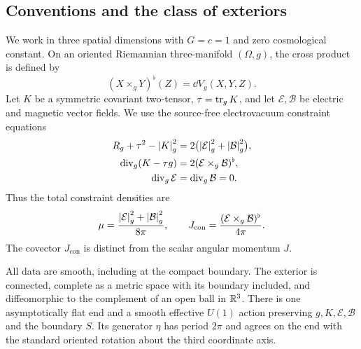 \subsection{Conventions and the class of exteriors}\label{sec:conventions}

We work in three spatial dimensions with \(G=c=1\) and zero cosmological
constant. On an oriented Riemannian three-manifold \((\Omega,g)\), the cross
product is defined by
\[
 (X\times_gY)^\flat(Z)=\dd V_g(X,Y,Z).
\]
Let \(K\) be a symmetric covariant two-tensor, \(\tau=\operatorname{tr}_gK\), and let
\(\mathcal E,\mathcal B\) be electric and magnetic vector fields. We use
the source-free electrovacuum constraint equations
\begin{equation}\label{eq:constraints}
 \begin{split}
 R_g+\tau^2-\left\lvert K\right\rvert_g^2
      &=2\bigl(\left\lvert\mathcal E\right\rvert_g^2+\left\lvert\mathcal B\right\rvert_g^2\bigr),\\
 \operatorname{div}_g(K-\tau g)
      &=2(\mathcal E\times_g\mathcal B)^\flat,\\
 \operatorname{div}_g\mathcal E
      &=\operatorname{div}_g\mathcal B=0.
 \end{split}
\end{equation}
Thus the total constraint densities are
\[
 \mu=\frac{\left\lvert\mathcal E\right\rvert_g^2+\left\lvert\mathcal B\right\rvert_g^2}{8\pi},
 \qquad J_{\mathrm{con}}
       =\frac{(\mathcal E\times_g\mathcal B)^\flat}{4\pi}.
\]
The covector \(J_{\mathrm{con}}\) is distinct from the scalar angular
momentum \(J\).

All data are smooth, including at the compact boundary. The exterior is
connected, complete as a metric space with its boundary included, and
diffeomorphic to the complement of an open ball in \(\mathbb R^3\). There is one
asymptotically flat end and a smooth effective \(U(1)\) action preserving
\(g,K,\mathcal E,\mathcal B\) and the boundary \(S\). Its generator \(\eta\)
has period \(2\pi\) and agrees on the end with the standard oriented
rotation about the third coordinate axis.


